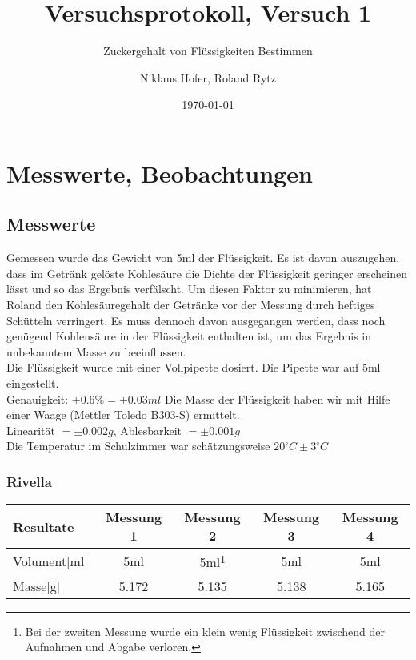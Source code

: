 \documentclass[11pt,paper=a4,final]{scrartcl}
\title{Versuchsprotokoll, Versuch 1}
\subtitle{Zuckergehalt von Fl\"ussigkeiten Bestimmen}
\author{Niklaus Hofer, Roland Rytz}
\date{\today{}}
\let\stdsection\section
\renewcommand\section{\newpage\stdsection}
\begin{document}
\maketitle
\newpage
\section{Messwerte, Beobachtungen}
\subsection{Messwerte}                                                
Gemessen wurde das Gewicht von 5ml der Fl\"ussigkeit. Es ist davon auszugehen, dass im Getr\"ank gel\"oste Kohles\"aure die Dichte der Fl\"ussigkeit geringer erscheinen l\"asst und so das Ergebnis verf\"alscht. Um diesen Faktor zu minimieren, hat Roland den Kohles\"auregehalt der Getr\"anke vor der Messung durch heftiges Sch\"utteln verringert. Es muss dennoch davon ausgegangen werden, dass noch gen\"ugend Kohlens\"aure in der Fl\"ussigkeit enthalten ist, um das Ergebnis in unbekanntem Masse zu beeinflussen.\\

Die Fl\"ussigkeit wurde mit einer Vollpipette dosiert. Die Pipette war auf 5ml eingestellt.\\
Genauigkeit: \(\pm0.6\% = \pm0.03ml\)\newline
Die Masse der Fl\"ussigkeit haben wir mit Hilfe einer Waage (Mettler Toledo B303-S) ermittelt.\\
Linearit\"at \( = \pm0.002g\), Ablesbarkeit \( = \pm0.001g\)\\
Die Temperatur im Schulzimmer war sch\"atzungsweise \(20^\circ C \pm 3^\circ C\)

\subsubsection{Rivella\textsuperscript{\textregistered}}
\begin{tabular}{|l|c|c|c|c|}
\hline
\bf Resultate & \bf Messung 1 & \bf Messung 2 & \bf Messung 3 & \bf Messung 4 \\ \hline
Volument[ml] & 5ml & 5ml\footnote{Bei der zweiten Messung wurde ein klein wenig Fl\"ussigkeit zwischend der Aufnahmen und Abgabe verloren.} & 5ml & 5ml \\ \hline
Masse[g]     & 5.172 & 5.135 & 5.138 & 5.165 \\ \hline
\end{tabular}


\newpage
\end{document}
